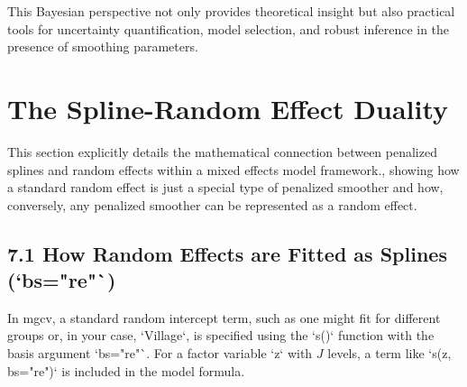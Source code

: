\documentclass[11pt, a4paper]{article}
\begin{document}
This Bayesian perspective not only provides theoretical insight but also practical tools for uncertainty quantification, model selection, and robust inference in the presence of smoothing parameters.
\section{The Spline-Random Effect Duality}
 This section explicitly details the mathematical connection between penalized splines and random effects within a mixed effects model framework., showing how a standard random effect is just a special type of penalized smoother and how, conversely, any penalized smoother can be represented as a random effect.

\subsection{7.1 How Random Effects are Fitted as Splines (`bs="re"`)}
In mgcv, a standard random intercept term, such as one might fit for different groups or, in your case, `Village`, is specified using the `s()` function with the basis argument `bs="re"`. For a factor variable `z` with $J$ levels, a term like `s(z, bs="re")` is included in the model formula.
\end{document}
